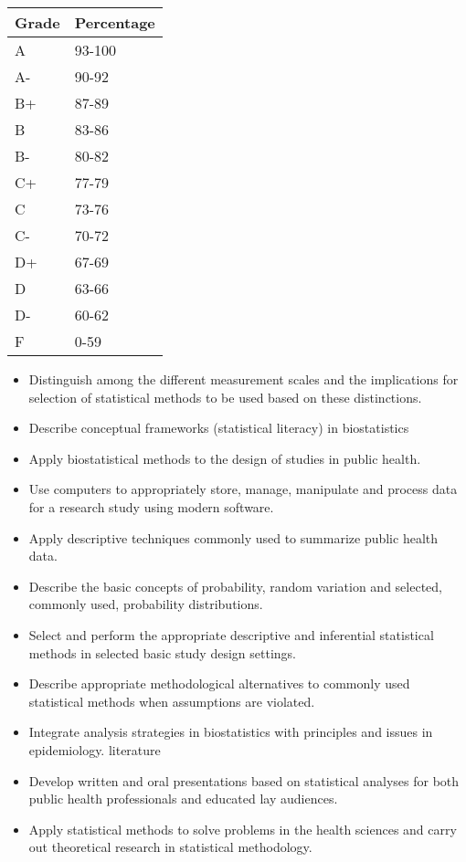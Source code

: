 \documentclass[10pt]{article}
\begin{document}
\bigskip

\begin{table}[htp]
\begin{tabular}{ll}
Grade & Percentage \\
\hline
A & 93-100 \\
A- & 90-92 \\
B+ & 87-89 \\
B & 83-86 \\
B- & 80-82 \\
C+ & 77-79 \\
C & 73-76 \\
C- & 70-72 \\
D+ & 67-69 \\
D & 63-66 \\
D- & 60-62\\
F & 0-59 \\
\end{tabular}
\end{table}%


  \clearpage
\bigskip
{}
\begin{itemize}
\item Distinguish among the different measurement scales and the implications for selection of statistical methods to be used based on these distinctions.
\item Describe conceptual frameworks (statistical literacy) in biostatistics
\item Apply biostatistical methods to the design of studies in public health.
\item Use computers to appropriately store, manage, manipulate and process data for a research study using modern software.
\item Apply descriptive techniques commonly used to summarize public health data. 
\item Describe the basic concepts of probability, random variation and selected, commonly used, probability distributions.
\item Select and perform the appropriate descriptive and inferential statistical methods in selected basic study design settings.
\item Describe appropriate methodological alternatives to commonly used statistical methods when assumptions are violated.
\item Integrate analysis strategies in biostatistics with principles and issues in epidemiology.
literature
\item Develop written and oral presentations based on statistical analyses for both public health professionals and educated lay audiences.
\item Apply statistical methods to solve problems in the health sciences and carry out theoretical research in statistical methodology.
\end{itemize}
  
\end{document}
